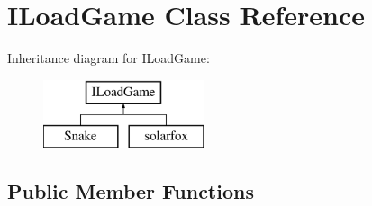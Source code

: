 \section{I\+Load\+Game Class Reference}
\label{class_i_load_game}
Inheritance diagram for I\+Load\+Game\+:\begin{figure}[H]
\begin{center}
\leavevmode
\includegraphics[height=2.000000cm]{class_i_load_game}
\end{center}
\end{figure}
\subsection*{Public Member Functions}
